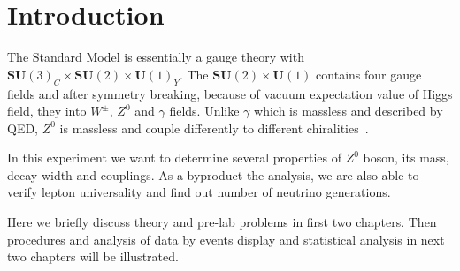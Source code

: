 \begin{abstract}
	Using OPAL data from LEP, we are able to determine the mass of $Z^0$ boson to be  \SI{91.118 +- 0.0133} and its decay width \SI{2.537 +- 0.0422}{\giga\eV}. Existence of $Z^0$ boson gives us forward-backward asymmetry, which helps us to determine Weinberg angle $\sin^2 \theta_W = \num{0.2347 +- 0.0112}$. By looking at different decay channels of $Z^0$, number of neutrino generation is calculated to be  \num{2.799 +- 0.422}.

\end{abstract}
\section{Introduction}
The Standard Model is essentially a gauge theory with $\mathbf{SU}(3)_C \times \mathbf{SU}(2) \times \mathbf{U}(1)_Y$. The $\mathbf{SU}(2) \times \mathbf{U}(1)$ contains four gauge fields and after symmetry breaking, because of vacuum expectation value of Higgs field, they into $W^{\pm}$, $Z^0$ and $\gamma$ fields. Unlike $\gamma$ which is massless and described by QED, $Z^0$ is massless and couple differently to different chiralities~\cite{Tapei}.

In this experiment we want to determine several properties of $Z^0$ boson, its mass, decay width and couplings. As a byproduct the analysis, we are also able to verify lepton universality and find out number of neutrino generations.

Here we briefly discuss theory and pre-lab problems in first two chapters. Then procedures and analysis of data by events display and statistical analysis in next two chapters will be illustrated. 

